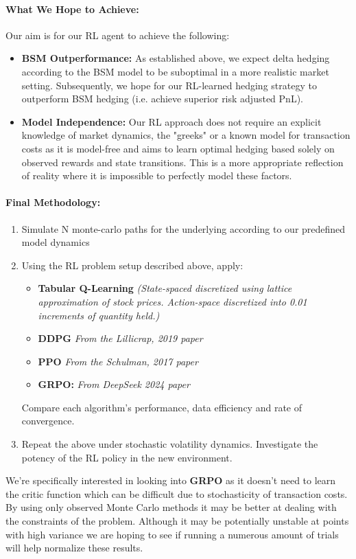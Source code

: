 \documentclass{article}
\begin{document}
\paragraph{What We Hope to Achieve:} Our aim is for our RL agent to achieve the following:
\begin{itemize}
    \item \textbf{BSM Outperformance:} As established above, we expect delta hedging according to the BSM model to be suboptimal in a more realistic market setting. Subsequently, we hope for our RL-learned hedging strategy to outperform BSM hedging (i.e. achieve superior risk adjusted PnL).
    \item \textbf{Model Independence:} Our RL approach does not require an explicit knowledge of market dynamics, the "greeks" or a known model for transaction costs as it is model-free and aims to learn optimal hedging based solely on observed rewards and state transitions. This is a more appropriate reflection of reality where it is impossible to perfectly model these factors.
\end{itemize}

\paragraph{Final Methodology:} 
\begin{enumerate}
    \item Simulate N monte-carlo paths for the underlying according to our predefined model dynamics
    \item Using the RL problem setup described above, apply:
    \begin{itemize}
        \item \textbf{Tabular Q-Learning} \textit{(State-spaced discretized using lattice approximation of stock prices. Action-space discretized into 0.01 increments of quantity held.)}
        \item \textbf{DDPG} \textit{From the Lillicrap, 2019 paper}\cite{lillicrap}
        \item \textbf{PPO} \textit{From the Schulman, 2017 paper} \cite{schulman}
        \item \textbf{GRPO:} \textit{ From DeepSeek 2024 paper} \cite{deepseek}
    \end{itemize}
    Compare each algorithm's performance, data efficiency and rate of convergence.
    \item Repeat the above under stochastic volatility dynamics. Investigate the potency of the RL policy in the new environment.
\end{enumerate}
We're specifically interested in looking into \textbf{GRPO} as it doesn't need to learn the critic function which can be difficult due to stochasticity of transaction costs. By using only observed Monte Carlo methods it may be better at dealing with the constraints of the problem. Although it may be potentially unstable at points with high variance we are hoping to see if running a numerous amount of trials will help normalize these results.

\end{document}
